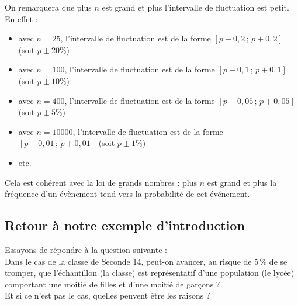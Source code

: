   
\begin{rmq}
On remarquera que plus $n$ est grand et plus l'intervalle de fluctuation est petit. En effet :
	\begin{itemize}
	 \item avec $n=25$, l'intervalle de fluctuation est de la forme $[p-0,2\,;\,p+0,2]$ (soit $p\pm 20\%$) 
	 \item avec $n=100$, l'intervalle de fluctuation est de la forme $[p-0,1\,;\,p+0,1]$ (soit $p\pm 10\%$) 
	 \item avec $n=400$, l'intervalle de fluctuation est de la forme $[p-0,05\,;\,p+0,05]$ (soit $p\pm 5\%$)  
	 \item avec $n=10000$, l'intervalle de fluctuation est de la forme $[p-0,01\,;\,p+0,01]$ (soit $p\pm 1\%$)  
	 \item etc.
	\end{itemize}
Cela est coh\'erent avec la loi de grands nombres : plus $n$ est grand et plus la fr\'equence d'un \'ev\`enement tend vers la probabilit\'e de cet \'ev\'enement.
\end{rmq}

\subsection{Retour \`a notre exemple d'introduction}
  
  
    Essayons de r\'epondre \`a la question suivante : \\
    \og Dans le cas de la classe de Seconde 14, peut-on avancer, au risque de 5\,\% de se tromper, que l'\'echantillon (la classe) est repr\'esentatif d'une population (le lyc\'ee) comportant une moiti\'e de filles et d'une moiti\'e de gar\c cons ?\\
    Et si ce n'est pas le cas, quelles peuvent \^etre les raisons ? \fg
    
